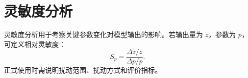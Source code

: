 \section{灵敏度分析}

灵敏度分析用于考察关键参数变化对模型输出的影响。若输出量为 $z$，参数为 $p$，可定义相对灵敏度：
\begin{equation}
  S_p = \frac{\Delta z / z}{\Delta p / p}.
  \label{eq:sensitivity}
\end{equation}
正式使用时需说明扰动范围、扰动方式和评价指标。
